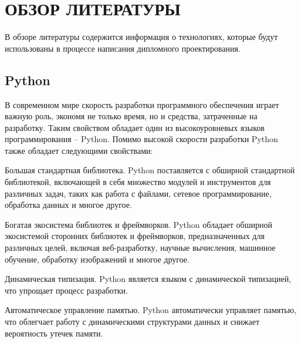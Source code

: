 \section{ОБЗОР ЛИТЕРАТУРЫ}
\label{sec:domain}

В обзоре литературы содержится информация о технологиях, которые будут использованы в процессе написания дипломного проектирования.


\subsection{Python}\label{subsec:domain:python}
В современном мире скорость разработки программного обеспечения играет важную роль, экономя не только время, но и средства, затраченные на разработку.
Таким свойством обладает один из высокоуровневых языков программирования -- Python\cite{python_desc}.
Помимо высокой скорости разработки Python также обладает следующими свойствами:
\begin{enumerate_num}
    \item Большая стандартная библиотека.
    Python поставляется с обширной стандартной библиотекой, включающей в себя множество модулей и инструментов для различных задач, таких как работа с файлами, сетевое программирование, обработка данных и многое другое.
    \item Богатая экосистема библиотек и фреймворков.
    Python обладает обширной экосистемой сторонних библиотек и фреймворков, предназначенных для различных целей, включая веб-разработку, научные вычисления, машинное обучение, обработку изображений и многое другое.
    \item Динамическая типизация.
    Python является языком с динамической типизацией, что упрощает процесс разработки.
    \item Автоматическое управление памятью.
    Python автоматически управляет памятью, что облегчает работу с динамическими структурами данных и снижает вероятность утечек памяти.
\end{enumerate_num}

